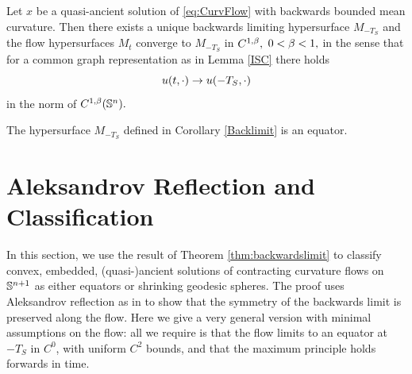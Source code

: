 \documentclass{amsart}
\begin{document}
\begin{cor}\label{Backlimit}
Let $x$ be a quasi-ancient solution of \eqref{eq:CurvFlow} with backwards bounded mean curvature. Then there exists a unique backwards limiting hypersurface $M_{-T_S}$ and the flow hypersurfaces $M_t$ converge to $M_{-T_S}$ in $C^{1,\b},$ $0<\b<1,$ in the sense that for a common graph representation as in Lemma \ref{ISC} there holds
$$u(t,\cdot)\ra u(-T_S,\cdot)$$
in the norm of $C^{1,\b}(\S^n).$
\end{cor}
\begin{thm}
\label{thm:backwardslimit}
The hypersurface $M_{-T_S}$ defined in Corollary \ref{Backlimit} is an equator.
\end{thm}
\section{Aleksandrov Reflection and Classification}\label{sec:reflection}
In this section, we use the result of Theorem \ref{thm:backwardslimit} to classify convex, embedded, (quasi-)ancient solutions of contracting curvature flows on \(\S^{n+1}\) as either equators or shrinking geodesic spheres. The proof uses Aleksandrov reflection as in \cite{2015arXiv150802821B,bryanlouie} to show that the symmetry of the backwards limit is preserved along the flow. Here we give a very general version with minimal assumptions on the flow: all we require is that the flow limits to an equator at $-T_S$ in \(C^0\), with uniform \(C^2\) bounds, and that the maximum principle holds forwards in time.
\end{document}
